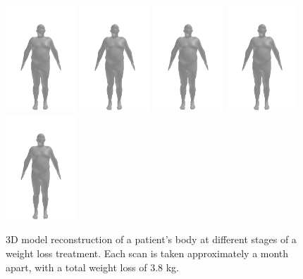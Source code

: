 \begin{figure}
	\centering
	\includegraphics[width=75pt]{files/patient_8/8_2}
	\includegraphics[width=75pt]{files/patient_8/8_3}
	\includegraphics[width=75pt]{files/patient_8/8_4}
	\includegraphics[width=75pt]{files/patient_8/8_5}
	\includegraphics[width=75pt]{files/patient_8/8_6}
	\caption[Reconstructed 3D body of a patient's scans]{3D model reconstruction of a patient's body at different stages of a weight loss
		treatment. Each scan is taken approximately a month apart, with a total
		weight loss of 3.8 kg.}
\end{figure}

